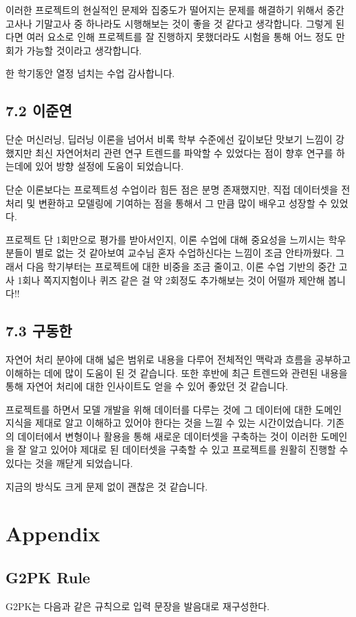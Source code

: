 \documentclass[letterpaper]{article} %
\begin{document}
이러한 프로젝트의 현실적인 문제와 집중도가 떨어지는 문제를 해결하기 위해서 중간고사나 기말고사 중 하나라도 시행해보는 것이 좋을 것 같다고 생각합니다. 그렇게 된다면 여러 요소로 인해 프로젝트를 잘 진행하지 못했더라도 시험을 통해 어느 정도 만회가 가능할 것이라고 생각합니다.

한 학기동안 열정 넘치는 수업 감사합니다.

\subsection{7.2 이준연}
단순 머신러닝, 딥러닝 이론을 넘어서 비록 학부 수준에선 깊이보단 맛보기 느낌이 강했지만 최신 자연어처리 관련 연구 트렌드를 파악할 수 있었다는 점이 향후 연구를 하는데에 있어 방향 설정에 도움이 되었습니다.

단순 이론보다는 프로젝트성 수업이라 힘든 점은 분명 존재했지만, 직접 데이터셋을 전처리 및 변환하고 모델링에 기여하는 점을 통해서 그 만큼 많이 배우고 성장할 수 있었다. 

프로젝트 단 1회만으로 평가를 받아서인지, 이론 수업에 대해 중요성을 느끼시는 학우분들이 별로 없는 것 같아보여 교수님 혼자 수업하신다는 느낌이 조금 안타까웠다. 그래서 다음 학기부터는 프로젝트에 대한 비중을 조금 줄이고, 이론 수업 기반의 중간 고사 1회나 쪽지지험이나 퀴즈 같은 걸 약 2회정도 추가해보는 것이 어떨까 제안해 봅니다!!

\subsection{7.3 구동한}
자연어 처리 분야에 대해 넓은 범위로 내용을 다루어 전체적인 맥락과 흐름을 공부하고 이해하는 데에 많이 도움이 된 것 같습니다. 또한 후반에 최근 트렌드와 관련된 내용을 통해 자연어 처리에 대한 인사이트도 얻을 수 있어 좋았던 것 같습니다.

프로젝트를 하면서 모델 개발을 위해 데이터를 다루는 것에 그 데이터에 대한 도메인 지식을 제대로 알고 이해하고 있어야 한다는 것을 느낄 수 있는 시간이었습니다. 기존의 데이터에서 변형이나 활용을 통해 새로운 데이터셋을 구축하는 것이 이러한 도메인을 잘 알고 있어야 제대로 된 데이터셋을 구축할 수 있고 프로젝트를 원활히 진행할 수 있다는 것을 깨닫게 되었습니다.

지금의 방식도 크게 문제 없이 괜찮은 것 같습니다.


\section{Appendix}
\subsection{G2PK Rule} \label{sec:g2pk_rule}
G2PK는 다음과 같은 규칙으로 입력 문장을 발음대로 재구성한다.
\end{document}
